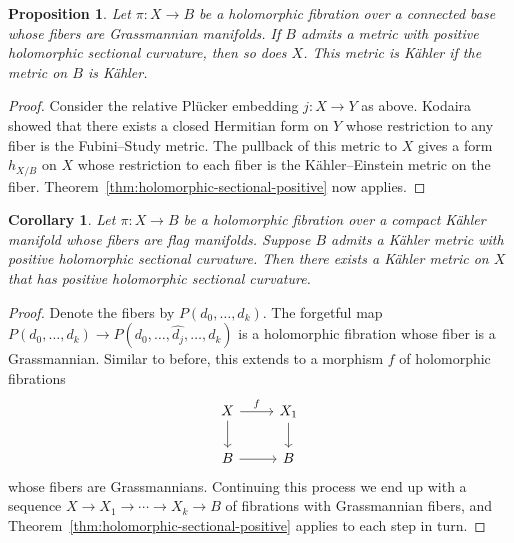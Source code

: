\documentclass[10pt,a4paper]{amsart}
\newtheorem{prop}[theo]{Proposition}
\newtheorem{coro}[theo]{Corollary}
\theoremstyle{definition}
\begin{document}
\begin{prop}
Let $\pi : X \to B$ be a holomorphic fibration over a connected base whose fibers are Grassmannian manifolds.
If $B$ admits a metric with positive holomorphic sectional curvature, then so does $X$.
This metric is K\"ahler if the metric on $B$ is K\"ahler.
\end{prop}

\begin{proof}
Consider the relative Pl\"ucker embedding $j : X \to Y$ as above.
Kodaira~\cite[Section 4(V)]{kodaira-embedding} showed that there exists a closed Hermitian form on $Y$ whose restriction to any fiber is the Fubini--Study metric.
The pullback of this metric to $X$ gives a form $h_{X/B}$ on $X$ whose restriction to each fiber is the K\"ahler--Einstein metric on the fiber.
Theorem~\ref{thm:holomorphic-sectional-positive} now applies.
\end{proof}



\begin{coro}
Let $\pi : X \to B$ be a holomorphic fibration over a compact K\"ahler manifold whose fibers are flag manifolds.
Suppose $B$ admits a K\"ahler metric with positive holomorphic sectional curvature.
Then there exists a K\"ahler metric on $X$ that has positive holomorphic sectional curvature.
\end{coro}

\begin{proof}
Denote the fibers by $P(d_{0}, \ldots, d_{k})$.
The forgetful map $P(d_{0}, \ldots, d_{k}) \to P(d_{0}, \ldots, \hat{d_{j}}, \ldots, d_{k})$ is a holomorphic fibration whose fiber is a Grassmannian.
Similar to before, this extends to a morphism $f$ of holomorphic fibrations
\[
\begin{tikzcd}
  X \ar[r,"f"]\ar[d] & X_{1} \ar[d]
  \\
  B \ar[r] & B
\end{tikzcd}
\]
whose fibers are Grassmannians.
Continuing this process we end up with a sequence $X \to X_{1} \to \cdots \to X_{k} \to B$ of fibrations with Grassmannian fibers, and Theorem~\ref{thm:holomorphic-sectional-positive} applies to each step in turn.
\end{proof}












\end{document}
